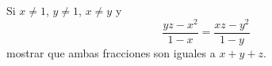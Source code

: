 Si $x\neq1$, $y\neq1$, $x\neq y$ y
\[ \frac{yz-x^{2}}{1-x}=\frac{xz-y^{2}}{1-y}\]
mostrar que ambas fracciones son iguales a $x+y+z$.
